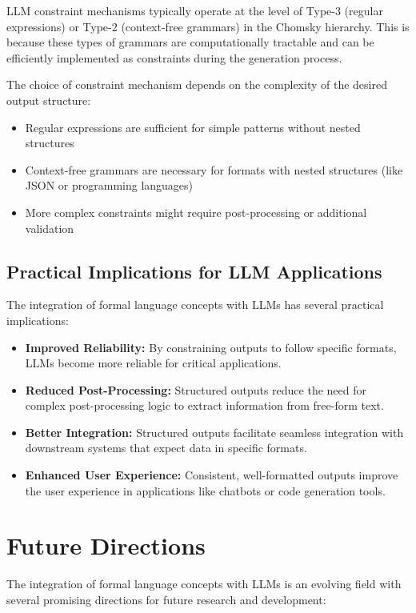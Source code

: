 \documentclass{article}
\begin{document}
LLM constraint mechanisms typically operate at the level of Type-3 (regular expressions) or Type-2 (context-free grammars) in the Chomsky hierarchy. This is because these types of grammars are computationally tractable and can be efficiently implemented as constraints during the generation process.

The choice of constraint mechanism depends on the complexity of the desired output structure:
\begin{itemize}
    \item Regular expressions are sufficient for simple patterns without nested structures
    \item Context-free grammars are necessary for formats with nested structures (like JSON or programming languages)
    \item More complex constraints might require post-processing or additional validation
\end{itemize}

\subsection{Practical Implications for LLM Applications}

The integration of formal language concepts with LLMs has several practical implications:

\begin{itemize}
    \item \textbf{Improved Reliability:} By constraining outputs to follow specific formats, LLMs become more reliable for critical applications.
    \item \textbf{Reduced Post-Processing:} Structured outputs reduce the need for complex post-processing logic to extract information from free-form text.
    \item \textbf{Better Integration:} Structured outputs facilitate seamless integration with downstream systems that expect data in specific formats.
    \item \textbf{Enhanced User Experience:} Consistent, well-formatted outputs improve the user experience in applications like chatbots or code generation tools.
\end{itemize}

\section{Future Directions}

The integration of formal language concepts with LLMs is an evolving field with several promising directions for future research and development:
\end{document}
